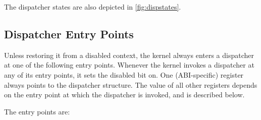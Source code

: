 \documentclass{scrreprt}
\begin{document}
  The dispatcher states are also depicted in \autoref{fig:dispstates}.

  \subsection{Dispatcher Entry Points}

  Unless restoring it from a disabled context, the kernel always
  enters a dispatcher at one of the following entry
  points. Whenever the kernel invokes a dispatcher at any of its entry
  points, it sets the disabled bit on. One (ABI-specific) register
  always points to the dispatcher structure. The value of all other
  registers depends on the entry point at which the dispatcher is
  invoked, and is described below.

  The entry points are:
\end{document}
